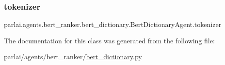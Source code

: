 \subsubsection{\texorpdfstring{tokenizer}{tokenizer}}
{\footnotesize\ttfamily parlai.\+agents.\+bert\+\_\+ranker.\+bert\+\_\+dictionary.\+Bert\+Dictionary\+Agent.\+tokenizer}



The documentation for this class was generated from the following file\+:\begin{DoxyCompactItemize}
\item 
parlai/agents/bert\+\_\+ranker/\hyperlink{bert__dictionary_8py}{bert\+\_\+dictionary.\+py}\end{DoxyCompactItemize}

